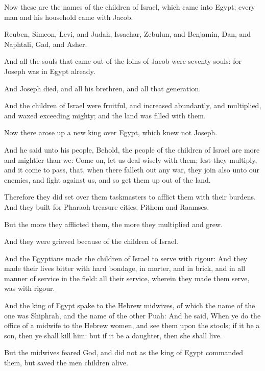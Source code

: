 

\verse Now these are the names of the children of Israel, which came
into Egypt; every man and his household came with Jacob.

\verse Reuben, Simeon, Levi, and Judah, \verse Issachar, Zebulun, and
Benjamin, \verse Dan, and Naphtali, Gad, and Asher.

\verse And all the souls that came out of the loins of Jacob were seventy
souls: for Joseph was in Egypt already.

\verse And Joseph died, and all his brethren, and all that generation.

\verse And the children of Israel were fruitful, and increased
abundantly, and multiplied, and waxed exceeding mighty; and the land
was filled with them.

\verse Now there arose up a new king over Egypt, which knew not Joseph.

\verse And he said unto his people, Behold, the people of the children of
Israel are more and mightier than we: \verse Come on, let us deal wisely
with them; lest they multiply, and it come to pass, that, when there
falleth out any war, they join also unto our enemies, and fight
against us, and so get them up out of the land.

\verse Therefore they did set over them taskmasters to afflict them with
their burdens. And they built for Pharaoh treasure cities, Pithom and
Raamses.

\verse But the more they afflicted them, the more they multiplied and
grew.

And they were grieved because of the children of Israel.

\verse And the Egyptians made the children of Israel to serve with
rigour: \verse And they made their lives bitter with hard bondage, in
morter, and in brick, and in all manner of service in the field: all
their service, wherein they made them serve, was with rigour.

\verse And the king of Egypt spake to the Hebrew midwives, of which the
name of the one was Shiphrah, and the name of the other Puah: \verse And
he said, When ye do the office of a midwife to the Hebrew women, and
see them upon the stools; if it be a son, then ye shall kill him: but
if it be a daughter, then she shall live.

\verse But the midwives feared God, and did not as the king of Egypt
commanded them, but saved the men children alive.


